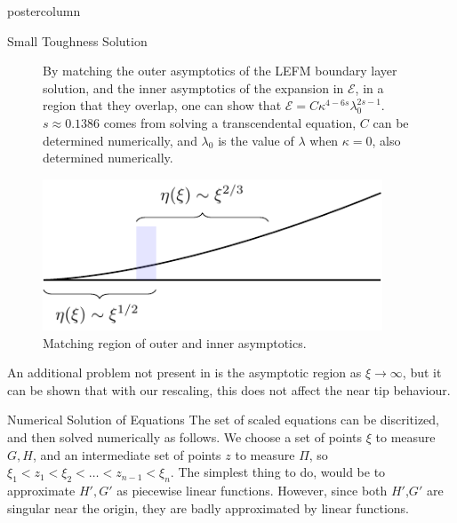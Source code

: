 \documentclass{beamer}
\newcommand{\cE}{\mathcal{E}}                               %
\begin{document}
\begin{frame}
\begin{columns}
\begin{column}{.57\textwidth}
\begin{beamercolorbox}[center]{postercolumn}
\begin{minipage}{.98\textwidth}
{\begin{myblock}{Small Toughness Solution}
\begin{figure}
\begin{minipage}{.52\textwidth}
By matching the outer asymptotics of the LEFM boundary layer solution, and
the inner asymptotics of the expansion in $\cE$, in a region that they overlap,
one can show that $\cE = C \kappa^{4-6s}\lambda_0^{2s-1}$. $s \approx 0.1386$
comes from solving a transcendental equation, $C$ can be determined numerically,
and $\lambda_0$ is the value of $\lambda$ when $\kappa=0$, also determined
numerically.
\end{minipage}
\begin{minipage}{.45\textwidth}
\centering\includegraphics[width=0.9\textwidth]{Fig7.pdf}
\caption{Matching region of outer and inner asymptotics.}
\end{minipage}
\end{figure}
An additional problem not present in \cite{GandD} is the asymptotic region
as $\xi\to \infty$, but it can be shown that with our rescaling, this does
not affect the near tip behaviour.
\end{myblock}\vfill
\begin{myblock}{Numerical Solution of Equations}
The set of scaled equations can be discritized, and then solved numerically
as follows. We choose a set of points $\xi$ to measure $G,H$, and an 
intermediate set of points $z$ to measure $\Pi$, so $\xi_1 < z_1 < \xi_2 <
\dots < z_{n-1} < \xi_n$.
The simplest thing to do, would be to approximate $H',G'$ as piecewise linear
functions. However, since both $H'$,$G'$ are singular near the origin, they
are badly approximated by linear functions.


\end{myblock}}
\end{minipage}
\end{beamercolorbox}
\end{column}
\end{columns}
\end{frame}
\end{document}
